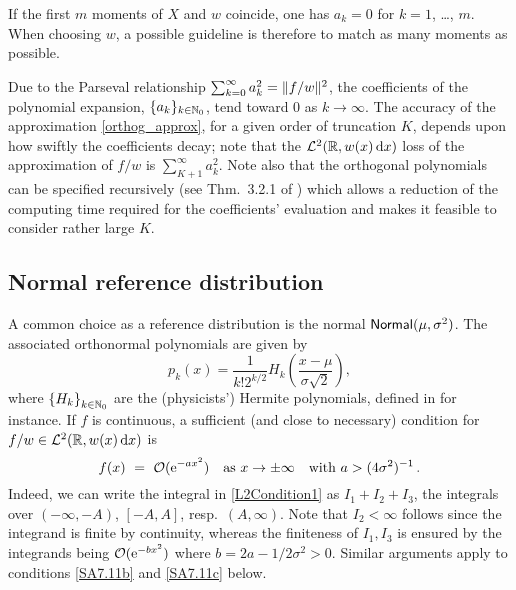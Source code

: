 \begin{remark}\label{Rem:27.10a}
If the first $m$ moments of $X$ and $w$ coincide, one has $a_k=0$ for $k=1$, \ldots, $m$.
When choosing $w$, a possible guideline is therefore to match as many moments as possible.
\remQED
\end{remark}

Due to the Parseval relationship $\sum_{k=0}^\infty a_k^2=\lVert f/w\rVert^2$, the coefficients of the polynomial expansion, $\{a_k\}_{k\in\mathbb{N}_0}$, tend toward $0$ as $k \to \infty$.
The accuracy of the approximation \eqref{orthog_approx}, for a given order of truncation $K$, depends upon how swiftly the coefficients decay; note that the $\mathcal{L}^2(\mathbb{R}, w(x) \mathop{}\!\mathrm{d} x)$ loss of the approximation of $f/w$ is $\sum_{K+1}^{\infty}a_k^2$.
Note also that the orthogonal polynomials can be specified recursively
(see Thm.~3.2.1 of \cite{Szegoe1939}) which allows a reduction of the computing time required for the coefficients' evaluation
and makes it feasible to consider rather large $K$.


\subsection{Normal reference distribution}\label{SS:NormalNu}
A common choice as a reference distribution is the normal $\mathsf{Normal}(\mu,\sigma^{2})$. The associated orthonormal polynomials are given by
\begin{equation}\label{eq:NormalDistributionOrthogonalPolynomial}
p_{k}(x)=\frac{1}{k!2^{k/2}}H_{k}\left(\frac{x-\mu}{\sigma\sqrt{2}}\right),
\end{equation}
where $\left\{H_{k}\right\}_{k\in\mathbb{N}_0}$ are the (physicists') Hermite polynomials, defined in \cite{Szegoe1939} for instance.
If $f$ is continuous, a sufficient (and close to necessary) condition for $f/w\in\mathcal{L}^2(\mathbb{R}, w(x) \mathop{}\!\mathrm{d} x)$ is
\begin{equation}\label{SA7.11a}
f(x)\ =\ {\mathcal{O}}(\mathrm{e}^{-ax^2})\quad\text{as }x\to\pm\infty\quad\text{with } a>(4\sigma^2)^{-1}\,.
\end{equation}
Indeed, we can  write the integral in \eqref{L2Condition1} as $I_1+I_2+I_3$, the integrals over
$(-\infty,-A)$, $[-A,A]$, resp.\ $(A,\infty)$. Note that $I_2<\infty$  follows since the integrand
is finite by continuity, whereas the finiteness of $I_1,I_3$ is ensured by the integrands
being ${\mathcal{O}}(\mathrm{e}^{-bx^2})$ where $b=2a-1/2\sigma^2>0$. Similar arguments apply to
conditions \eqref{SA7.11b} and \eqref{SA7.11c} below.

